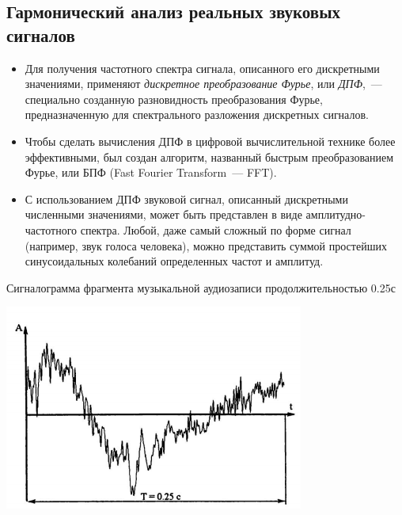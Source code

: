 \documentclass{beamer}
\begin{document}
\subsection{Гармонический анализ реальных звуковых сигналов}
\begin{frame}
\begin{itemize}
\item Для получения частотного спектра сигнала, описанного его дискретными значениями, применяют {\itshape дискретное преобразование Фурье}, или {\itshape ДПФ},~--- специально созданную разновидность преобразования Фурье, предназначенную для спектрального разложения дискретных сигналов.
\pause
\item Чтобы сделать вычисления ДПФ в цифровой вычислительной технике более эффективными, был создан алгоритм, названный быстрым преобразованием Фурье, или БПФ (Fast Fourier Transform~--- FFT).
\pause
\item С использованием ДПФ звуковой сигнал, описанный дискретными численными значениями, может быть представлен в виде амплитудно-частотного спектра. Любой, даже самый сложный по форме сигнал (например, звук голоса человека), можно представить суммой простейших синусоидальных колебаний определенных частот и амплитуд. 
\end{itemize}
\end{frame}    

\begin{frame}
\begin{block}{Сигналограмма фрагмента музыкальной аудиозаписи продолжительностью 0.25с}
\begin{center}
\includegraphics{pic-specter-04}
\end{center}
\end{block}
\end{frame} 
\end{document}

